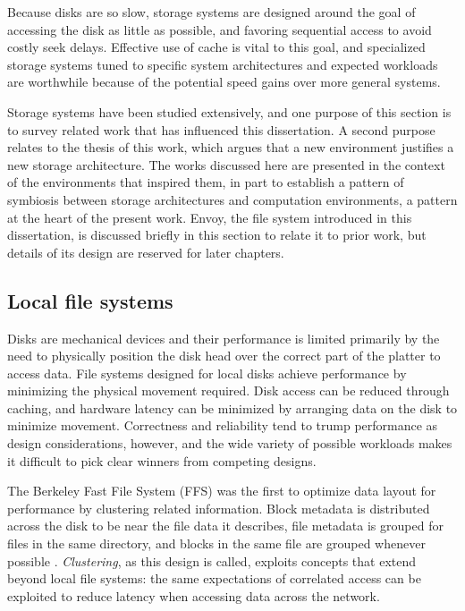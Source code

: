 Because disks are so slow, storage systems are designed around the goal of accessing the disk as little as possible, and favoring sequential access to avoid costly seek delays. Effective use of cache is vital to this goal, and specialized storage systems tuned to specific system architectures and expected workloads are worthwhile because of the potential speed gains over more general systems.

Storage systems have been studied extensively, and one purpose of this section is to survey related work that has influenced this dissertation. A second purpose relates to the thesis of this work, which argues that a new environment justifies a new storage architecture. The works discussed here are presented in the context of the environments that inspired them, in part to establish a pattern of symbiosis between storage architectures and computation environments, a pattern at the heart of the present work. Envoy, the file system introduced in this dissertation, is discussed briefly in this section to relate it to prior work, but details of its design are reserved for later chapters.

\subsection{Local file systems}

Disks are mechanical devices and their performance is limited primarily by the need to physically position the disk head over the correct part of the platter to access data. File systems designed for local disks achieve performance by minimizing the physical movement required. Disk access can be reduced through caching, and hardware latency can be minimized by arranging data on the disk to minimize movement. Correctness and reliability tend to trump performance as design considerations, however, and the wide variety of possible workloads makes it difficult to pick clear winners from competing designs.

The Berkeley Fast File System (FFS) was the first to optimize data layout for performance by clustering related information. Block metadata is distributed across the disk to be near the file data it describes, file metadata is grouped for files in the same directory, and blocks in the same file are grouped whenever possible \cite{mckusick}. \emph{Clustering}, as this design is called, exploits concepts that extend beyond local file systems: the same expectations of correlated access can be exploited to reduce latency when accessing data across the network.

